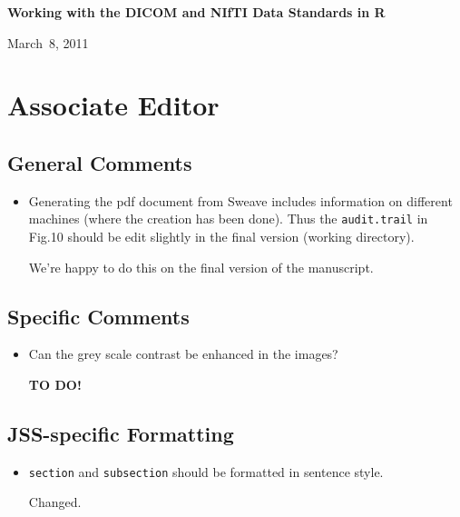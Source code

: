 \documentclass[11pt]{article}
\begin{document}

\begin{center}
{\Large \textbf{Working with the {DICOM} and {NIfTI} Data Standards in \textsf{R}}}

\bigskip

March~8, 2011

\end{center}

\section*{Associate Editor}

\subsection*{General Comments}

\begin{itemize}
  
\item Generating the pdf document from Sweave includes information on
  different machines (where the creation has been done). Thus the
  \texttt{audit.trail} in Fig.10 should be edit slightly in the final
  version (working directory).
  
  We're happy to do this on the final version of the manuscript.
  
\end{itemize}

\subsection*{Specific Comments}

\begin{itemize}
  
\item Can the grey scale contrast be enhanced in the images?

  \textbf{TO DO!}  

\end{itemize}

\subsection*{JSS-specific Formatting}

\begin{itemize}
  
\item \texttt{section} and \texttt{subsection} should be formatted in
  sentence style.
  
  Changed.

\end{itemize}
\end{document}
